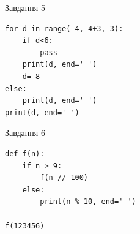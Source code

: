 \documentclass[12pt, ukrainian]{article}
\begin{document}
{\vspace{15mm}
\begin{minipage}[t]{9.7cm}                
{\begin{center}Завдання {5}\end{center}}
\begin{verbatim}
for d in range(-4,-4+3,-3):
    if d<6:
        pass
    print(d, end=' ')
    d=-8
else:
    print(d, end=' ')
print(d, end=' ')
\end{verbatim}     
\end{minipage}
\vline \hspace{8mm}
\begin{minipage}[t]{8.0cm}                
{\begin{center}Завдання {6}\end{center}}
\begin{verbatim}
def f(n):
    if n > 9:
        f(n // 100)
    else:
        print(n % 10, end=' ')

f(123456)
\end{verbatim}     
\end{minipage}

}
\newpage
\end{document}
